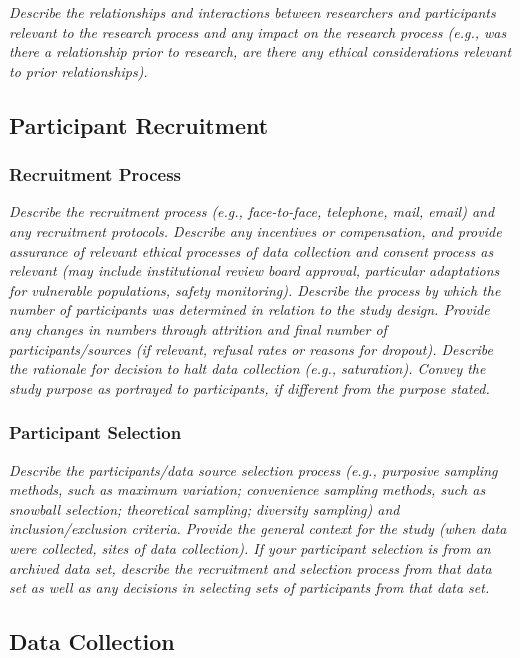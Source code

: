 \documentclass[acmsmall]{acmart}
\begin{document}
{\em\small  Describe the relationships and interactions between researchers and participants relevant to the research process and any impact on the research process (e.g., was there a relationship prior to research, are there any ethical considerations relevant to prior relationships). }


\subsection{Participant Recruitment}
\subsubsection{Recruitment Process}

{\em\small Describe the recruitment process (e.g., face-to-face, telephone, mail, email) and any recruitment protocols. Describe any incentives or compensation, and provide assurance of relevant ethical processes of data collection and consent process as relevant (may include institutional review board approval, particular adaptations for vulnerable populations, safety monitoring). Describe the process by which the number of participants was determined in relation to the
study design. Provide any changes in numbers through attrition and final number of participants/sources (if relevant, refusal rates or reasons for dropout). Describe the rationale for decision to halt data collection (e.g., saturation). Convey the study purpose as portrayed to participants, if different from the purpose stated. }

\subsubsection{Participant Selection}

{\em\small Describe the participants/data source selection process (e.g., purposive sampling methods, such as maximum variation; convenience sampling methods, such as snowball selection; theoretical sampling; diversity sampling) and inclusion/exclusion criteria. Provide the general context for the study (when data were collected, sites of data collection). If your participant selection is from an archived data set, describe the recruitment and selection process from that data set as well as any decisions in selecting sets of participants from that data set. }

\subsection{Data Collection}
\end{document}
